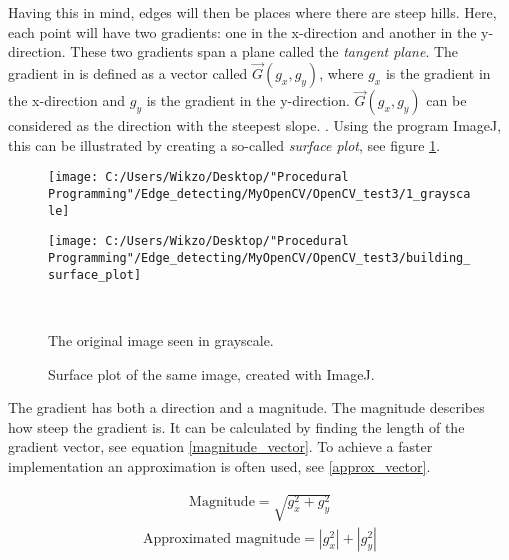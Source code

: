 Having this in mind, edges will then be places where there are steep hills. Here, each point will have two gradients: one in the x-direction and another in the y-direction. These two gradients span a plane called the \textit{tangent plane}. The gradient in is defined as a vector called $\vec{G}(g_x,g_y)$, where $g_x$ is the gradient in the x-direction and $g_y$ is the gradient in the y-direction. $\vec{G}(g_x,g_y)$ can be considered as the direction with the steepest slope. \citep{ip_book}. Using the program ImageJ, this can be illustrated by creating a so-called \textit{surface plot}, see figure \ref{surface_plot}.

\begin{figure}[htbp]\centering
	\begin{minipage}[b]{0.48\textwidth}\centering
		\texttt{[image: C:/Users/Wikzo/Desktop/"Procedural Programming"/Edge\_detecting/MyOpenCV/OpenCV\_test3/1\_grayscale]} %
	\end{minipage}\hfill
	\begin{minipage}[b]{0.48\textwidth}\centering
		\texttt{[image: C:/Users/Wikzo/Desktop/"Procedural Programming"/Edge\_detecting/MyOpenCV/OpenCV\_test3/building\_surface\_plot]} %
	\end{minipage}\\ %
	\begin{minipage}[t]{0.48\textwidth}
		\caption{The original image seen in grayscale.} %
		\label{building_gray}
	\end{minipage}\hfill
	\begin{minipage}[t]{0.48\textwidth}
		\caption{Surface plot of the same image, created with ImageJ.} %
		\label{surface_plot}
	\end{minipage}
\end{figure}

The gradient has both a direction and a magnitude. The magnitude describes how steep the gradient is. It can be calculated by finding the length of the gradient vector, see equation \ref{magnitude_vector}. To achieve a faster implementation an approximation is often used, see \ref{approx_vector}.

\begin{align}
\text{Magnitude} = \sqrt{g_x^2 + g_y^2}
\label{magnitude_vector}
\end{align}
\begin{align}
\text{Approximated magnitude} = |g_x^2| + |g_y^2|
\label{approx_vector}
\end{align}


